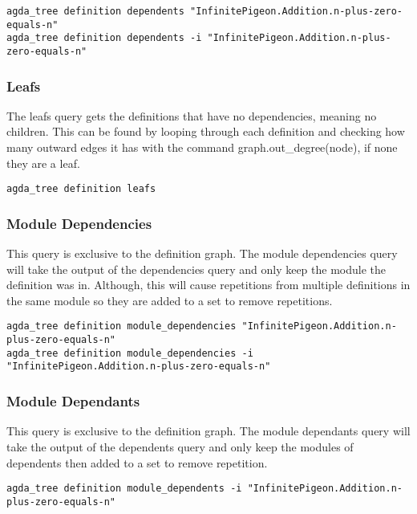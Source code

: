 \begin{lstlisting}
agda_tree definition dependents "InfinitePigeon.Addition.n-plus-zero-equals-n"
agda_tree definition dependents -i "InfinitePigeon.Addition.n-plus-zero-equals-n"
\end{lstlisting}

\subsubsection{Leafs}

The leafs query gets the definitions that have no dependencies, meaning no
children. This can be found by looping through each definition and checking how
many outward edges it has with the command \textsf{graph.out\_degree(node)}, if none
they are a leaf.

\begin{lstlisting}
agda_tree definition leafs
\end{lstlisting}

\subsubsection{Module Dependencies}

This query is exclusive to the definition graph. The module dependencies query
will take the output of the dependencies query and only keep the module the
definition was in. Although, this will cause repetitions from multiple
definitions in the same module so they are added to a set to remove
repetitions.

\begin{lstlisting}
agda_tree definition module_dependencies "InfinitePigeon.Addition.n-plus-zero-equals-n"
agda_tree definition module_dependencies -i "InfinitePigeon.Addition.n-plus-zero-equals-n"
\end{lstlisting}

\subsubsection{Module Dependants}

This query is exclusive to the definition graph. The module dependants query will take the output of the dependents query and
only keep the modules of dependents then added to a set to remove repetition.

\begin{lstlisting}
agda_tree definition module_dependents -i "InfinitePigeon.Addition.n-plus-zero-equals-n"
\end{lstlisting}

